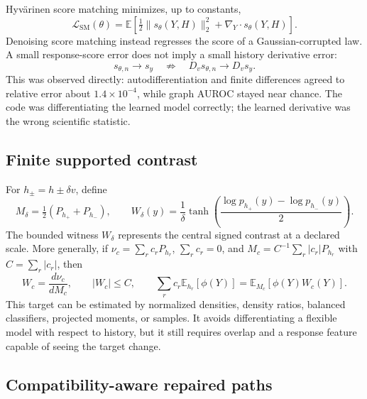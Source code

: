\documentclass[10pt]{article}
\newcommand{\E}{\mathbb{E}}
\begin{document}
Hyv\"arinen score matching minimizes, up to constants,
\begin{equation}
 \mathcal L_{\mathrm{SM}}(\theta)=\E\!\left[\tfrac12\|s_\theta(Y,H)\|_2^2+\nabla_Y\cdot s_\theta(Y,H)\right].
\end{equation}
Denoising score matching instead regresses the score of a Gaussian-corrupted law. A small response-score error does not imply a small history derivative error:
\begin{equation}
 s_{\theta,n}\to s_y \quad\not\Rightarrow\quad D_v s_{\theta,n}\to D_vs_y.
\end{equation}
This was observed directly: autodifferentiation and finite differences agreed to relative error about $1.4\times10^{-4}$, while graph AUROC stayed near chance. The code was differentiating the learned model correctly; the learned derivative was the wrong scientific statistic.

\subsection{Finite supported contrast}

For $h_\pm=h\pm\delta v$, define
\begin{equation}
 M_\delta=\tfrac12(P_{h_+}+P_{h_-}),\qquad
 W_\delta(y)=\frac{1}{\delta}\tanh\!\left(\frac{\log p_{h_+}(y)-\log p_{h_-}(y)}{2}\right).
\end{equation}
The bounded witness $W_\delta$ represents the central signed contrast at a declared scale. More generally, if $\nu_c=\sum_r c_rP_{h_r}$, $\sum_rc_r=0$, and $M_c=C^{-1}\sum_r|c_r|P_{h_r}$ with $C=\sum_r|c_r|$, then
\begin{equation}
 W_c=\frac{d\nu_c}{dM_c},\qquad |W_c|\le C,\qquad
 \sum_rc_r\E_{h_r}[\phi(Y)]=\E_{M_c}[\phi(Y)W_c(Y)].
\end{equation}
This target can be estimated by normalized densities, density ratios, balanced classifiers, projected moments, or samples. It avoids differentiating a flexible model with respect to history, but it still requires overlap and a response feature capable of seeing the target change.

\subsection{Compatibility-aware repaired paths}
\end{document}
